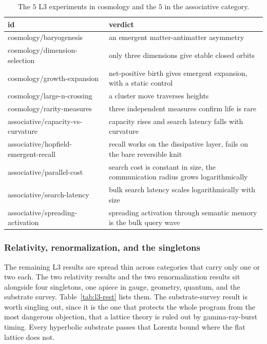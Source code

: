 \begin{table}[ht]
\centering
\begin{tabular}{@{}ll@{}}
\toprule
id & verdict \\
\midrule
cosmology/baryogenesis & an emergent matter-antimatter asymmetry \\
cosmology/dimension-selection & only three dimensions give stable closed orbits \\
cosmology/growth-expansion & net-positive birth gives emergent expansion, with a static control \\
cosmology/large-n-crossing & a cluster move traverses heights \\
cosmology/rarity-measures & three independent measures confirm life is rare \\
associative/capacity-vs-curvature & capacity rises and search latency falls with curvature \\
associative/hopfield-emergent-recall & recall works on the dissipative layer, fails on the bare reversible knit \\
associative/parallel-cost & search cost is constant in size, the communication radius grows logarithmically \\
associative/search-latency & bulk search latency scales logarithmically with size \\
associative/spreading-activation & spreading activation through semantic memory is the bulk query wave \\
\bottomrule
\end{tabular}
\caption{The $5$ L3 experiments in cosmology and the $5$ in the associative category.}
\label{tab:l3-cosmo-assoc}
\end{table}

\subsubsection{Relativity, renormalization, and the singletons}

The remaining L3 results are spread thin across categories that carry only one or two each. The two relativity results and the two renormalization results sit alongside four singletons, one apiece in gauge, geometry, quantum, and the substrate survey. Table~\ref{tab:l3-rest} lists them. The substrate-survey result is worth singling out, since it is the one that protects the whole program from the most dangerous objection, that a lattice theory is ruled out by gamma-ray-burst timing. Every hyperbolic substrate passes that Lorentz bound where the flat lattice does not.

